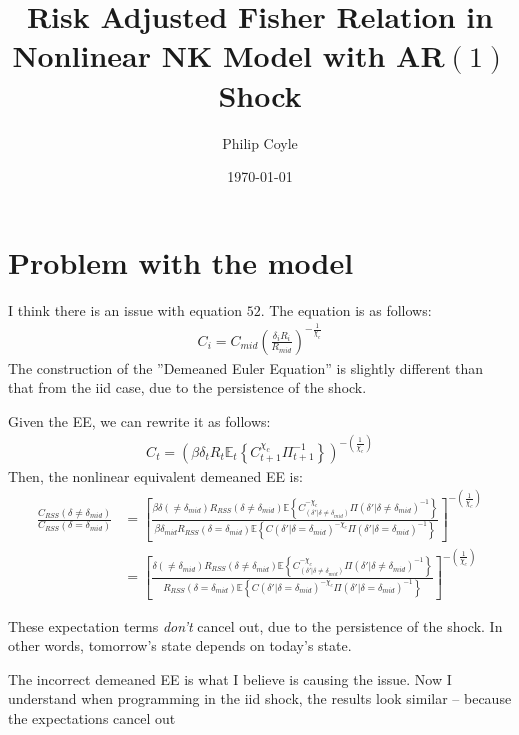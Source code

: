 \documentclass[11pt]{article}
\begin{document}
	\title{Risk Adjusted Fisher Relation in Nonlinear NK Model with AR$(1)$ Shock }
	\author{
		Philip Coyle}
	\date{\mydate\today}

	\maketitle

	\vspace{-0.3in}


\section{Problem with the model}

I think there is an issue with equation $52$. The equation is as follows:
\begin{align*}
	C_i = C_{mid}\left(\frac{\delta_i R_i}{R_{mid}}\right)^{-\frac{1}{\chi_c}}
\end{align*}
The construction of the ''Demeaned Euler Equation'' is slightly different than that from the iid case, due to the persistence of the shock.

Given the EE, we can rewrite it as follows:
\begin{align}
C_{t}	= \left(\beta \delta_t R_t \mathbb{E}_t \left\{C_{t+1}^{\chi_c} \Pi_{t+1}^{-1}\right\}\right)^{-\left(\frac{1}{\chi_c}\right)}
\end{align}
Then, the nonlinear equivalent demeaned EE is:
\begin{align}
	\frac{C_{RSS}(\delta \neq \delta_{mid})}{C_{RSS}(\delta = \delta_{mid})} & = \left[\frac{\beta \delta(\neq \delta_{mid}) R_{RSS}(\delta \neq \delta_{mid}) \mathbb{E} \left\{C_(\delta' | \delta \neq \delta_{mid})^{-\chi_c} \Pi(\delta' | \delta \neq \delta_{mid})^{-1}\right\}}{\beta \delta_{mid} R_{RSS}(\delta = \delta_{mid}) \mathbb{E} \left\{C(\delta' | \delta = \delta_{mid})^{-\chi_c} \Pi(\delta' | \delta = \delta_{mid})^{-1}\right\}}\right]^{-\left(\frac{1}{\chi_c}\right)} \\
	& = \left[\frac{\delta(\neq \delta_{mid}) R_{RSS}(\delta \neq \delta_{mid}) \mathbb{E} \left\{C_(\delta' | \delta \neq \delta_{mid})^{-\chi_c} \Pi(\delta' | \delta \neq \delta_{mid})^{-1}\right\}}{R_{RSS}(\delta = \delta_{mid}) \mathbb{E} \left\{C(\delta' | \delta = \delta_{mid})^{-\chi_c} \Pi(\delta' | \delta = \delta_{mid})^{-1}\right\}}\right]^{-\left(\frac{1}{\chi_c}\right)}
\end{align}



These expectation terms \emph{don't} cancel out, due to the persistence of the shock. In other words, tomorrow's state depends on today's state.

The incorrect demeaned EE is what I believe is causing the issue. Now I understand when programming in the iid shock, the results look similar -- because the expectations cancel out
\end{document}
